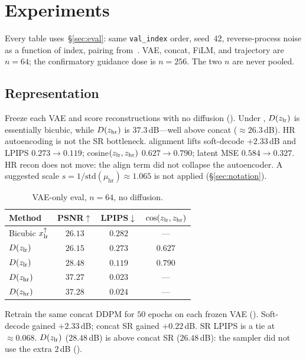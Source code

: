 \section{Experiments}
\label{sec:experiments}

Every table uses~\S\ref{sec:eval}: same \texttt{val\_index} order,
seed~$42$, reverse-process noise as a function of index, pairing
from~.
VAE, concat, FiLM, and trajectory are $n{=}64$; the confirmatory
guidance dose is $n{=}256$.
The two $n$ are never pooled.

\subsection{Representation}
\label{sec:exp-rep}

Freeze each VAE and score reconstructions with no diffusion
().
Under \vaeone{}, $D(z_{\mathrm{lr}})$ is essentially bicubic, while
$D(z_{\mathrm{hr}})$ is $37.3$\,dB---well above concat \lsrmethod{}
($\approx 26.3$\,dB).
HR autoencoding is not the SR bottleneck.
\vaesr{} alignment lifts soft-decode $\mathbf{+2.33}$\,dB and LPIPS
$0.273\to 0.119$; cosine$(z_{\mathrm{lr}},z_{\mathrm{hr}})$ $0.627\to 0.790$; latent MSE
$0.584\to 0.327$.
HR recon does not move: the align term did not collapse the
autoencoder.
A suggested scale $s=1/\mathrm{std}(\mu_{\mathrm{hr}})\approx 1.065$
is not applied (\S\ref{sec:notation}).

\begin{table}[H]
  \centering
  \caption{VAE-only eval, $n{=}64$, no diffusion.}
  \label{tab:vae-only}
  \small
  \begin{tabular}{@{}lccc@{}}
    \toprule
    Method & PSNR$\uparrow$ & LPIPS$\downarrow$ & $\cos(z_{\mathrm{lr}},z_{\mathrm{hr}})$ \\
    \midrule
    Bicubic $x_{\mathrm{lr}}^{\uparrow}$ & $26.13$ & $0.282$ & --- \\
    \vaeone{} $D(z_{\mathrm{lr}})$ & $26.15$ & $0.273$ & $0.627$ \\
    \vaesr{} $D(z_{\mathrm{lr}})$ & $\mathbf{28.48}$ & $\mathbf{0.119}$ & $\mathbf{0.790}$ \\
    \vaeone{} $D(z_{\mathrm{hr}})$ & $37.27$ & $0.023$ & --- \\
    \vaesr{} $D(z_{\mathrm{hr}})$ & $37.28$ & $0.024$ & --- \\
    \bottomrule
  \end{tabular}
\end{table}

Retrain the same concat DDPM for $50$ epochs on each frozen VAE
().
Soft-decode gained $+2.33$\,dB; concat SR gained $\mathbf{+0.22}$\,dB.
SR LPIPS is a tie at $\approx 0.068$.
\vaesr{} $D(z_{\mathrm{lr}})$ ($28.48$\,dB) is above concat SR ($26.48$\,dB):
the sampler did not use the extra $2$\,dB ().

